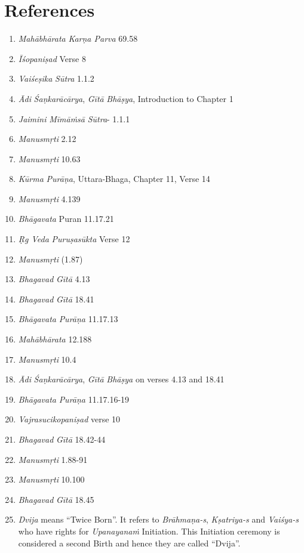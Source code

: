 \section*{References}

\begin{enumerate}
\itemsep=1pt
\item
  \emph{Mahābhārata} \emph{Karṇa Parva} 69.58
\item
  \emph{Īśopaniṣad} Verse 8
\item
  \emph{Vaiśeṣika} \emph{Sūtra} 1.1.2
\item
  \emph{Ādi} \emph{Śaṇkarācārya}, \emph{Gītā} \emph{Bhāṣya}, Introduction to Chapter 1
\item
  \emph{Jaimini} \emph{Mīmāṁsā} \emph{Sūtra}- 1.1.1
\item
  \emph{Manusmṛti} 2.12
\item
  \emph{Manusmṛti} 10.63
\item
  \emph{Kūrma} \emph{Purāṇa}, Uttara-Bhaga, Chapter 11, Verse 14
\item
  \emph{Manusmṛti} 4.139
\item
  \emph{Bhāgavata} Puran 11.17.21
\item
  \emph{Ṛg Veda} \emph{Puruṣasūkta} Verse 12
\item
  \emph{Manusmṛti} (1.87)
\item
  \emph{Bhagavad} \emph{Gītā} 4.13
\item
  \emph{Bhagavad} \emph{Gītā} 18.41
\item
  \emph{Bhāgavata} \emph{Purāṇa} 11.17.13
\item
  \emph{Mahābhārata} 12.188
\item
  \emph{Manusmṛti} 10.4
\item
  \emph{Ādi} \emph{Śaṇkarācārya}, \emph{Gītā} \emph{Bhāṣya} on verses 4.13 and 18.41
\item
  \emph{Bhāgavata} \emph{Purāṇa} 11.17.16-19
\item
  \emph{Vajrasucikopaniṣad} verse 10
\item
  \emph{Bhagavad} \emph{Gītā} 18.42-44
\item
  \emph{Manusmṛti} 1.88-91
\item
  \emph{Manusmṛti} 10.100
\item
  \emph{Bhagavad} \emph{Gītā} 18.45
\item
  \emph{Dvija} means ``Twice Born''. It refers to \emph{Brāhmaṇa-s}, \emph{Kṣatriya-s} and \emph{Vaiśya-s} who have rights for \emph{Upanayanaṁ} Initiation. This Initiation ceremony is considered a second Birth and hence they are called ``Dvija''.

\end{enumerate}
